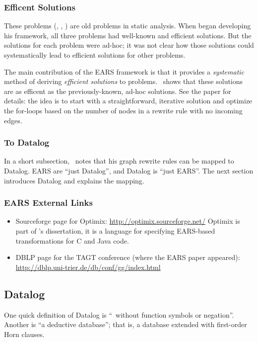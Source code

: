 \documentclass{article}
\begin{document}
\subsubsection*{Efficent Solutions}

These problems ({\bb}, {\rd}, {\eq}) are old problems in static analysis.
When \assmann{} began developing his framework, all three problems had well-known and efficient solutions.
But the solutions for each problem were ad-hoc; it was not clear how those solutions could systematically lead to efficient solutions for other problems.

The main contribution of the EARS framework is that it provides a \emph{systematic} method of deriving \emph{efficient solutions} to problems.
\assmann\ shows that these solutions are as efficent as the previously-known, ad-hoc solutions.
See the paper for details: the idea is to start with a straightforward, iterative solution and optimize the for-loops based on the number of nodes in a rewrite rule with no incoming edges.


\subsubsection*{To Datalog}

In a short subsection, \assmann\ notes that his graph rewrite rules can be mapped to Datalog.
EARS are ``just Datalog'', and Datalog is ``just EARS''.
The next section introduces Datalog and explains the mapping.


\subsubsection*{EARS External Links}
\begin{itemize}
\item Sourceforge page for Optimix: \url{http://optimix.sourceforge.net/}
  Optimix is part of \assmann{}'s dissertation, it is a language for specifying EARS-based transformations for C and Java code.
\item DBLP page for the TAGT conference (where the EARS paper appeared): \url{http://dblp.uni-trier.de/db/conf/gg/index.html}
\end{itemize}


\subsection*{Datalog}

One quick definition of Datalog is ``\prolog\ without function symbols or negation''.
Another is ``a deductive database''; that is, a database extended with first-order Horn clauses.
\end{document}
